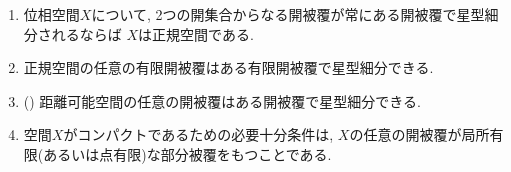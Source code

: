 \documentclass[uplatex, dvipdfmx, a4paper, 12pt, class=jsarticle, crop=false]{standalone}
\begin{document}
\begin{problem}[5.1.A]\label{eng-5-1-A-problem}
    \begin{enumerate}
        \item {}位相空間\(X\)について,
        2つの開集合からなる開被覆が常にある開被覆で星型細分されるならば
        \(X\)は正規空間である.

        \item 正規空間の任意の有限開被覆はある有限開被覆で星型細分できる.

        \item({\Tukey [1940]})
            距離可能空間の任意の開被覆はある開被覆で星型細分できる.

        \item \Hausdorff 空間\(X\)がコンパクトであるための必要十分条件は,
        \(X\)の任意の開被覆が局所有限(あるいは点有限)な部分被覆をもつことである.
    \end{enumerate}
\end{problem}
\end{document}
